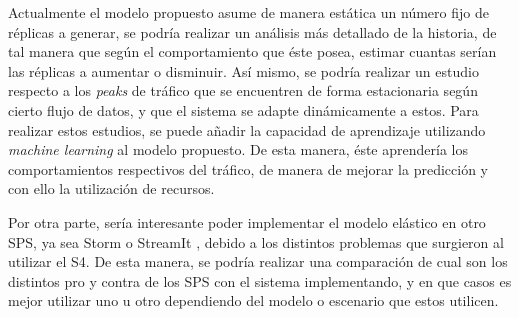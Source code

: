 Actualmente el modelo propuesto asume de manera estática un número fijo de réplicas a generar, se podría realizar un análisis más detallado de la historia, de tal manera que según el comportamiento que éste posea, estimar cuantas serían las réplicas a aumentar o disminuir. Así mismo, se podría realizar un estudio respecto a los \textit{peaks} de tráfico que se encuentren de forma estacionaria según cierto flujo de datos, y que el sistema se adapte dinámicamente a estos. Para realizar estos estudios, se puede añadir la capacidad de aprendizaje utilizando \textit{machine learning} \citep{bookMohri2012} al modelo propuesto. De esta manera, éste aprendería los comportamientos respectivos del tráfico, de manera de mejorar la predicción y con ello la utilización de recursos.


Por otra parte, sería interesante poder implementar el modelo elástico en otro SPS, ya sea Storm \citep{stormtwitter} o StreamIt \citep{ThiesKA02}, debido a los distintos problemas que surgieron al utilizar el S4. De esta manera, se podría realizar una comparación de cual son los distintos pro y contra de los SPS con el sistema implementando, y en que casos es mejor utilizar uno u otro dependiendo del modelo o escenario que estos utilicen.